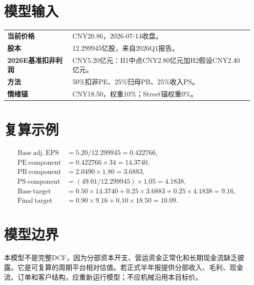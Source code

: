 \section{模型输入}
\small
\begin{tabularx}{0.94\linewidth}{L{3.2cm}X}
\textbf{当前价格} & CNY20.86，2026-07-14收盘。 \\
\textbf{股本} & 12.299945亿股，来自2026Q1报告。 \\
\textbf{2026E基准扣非利润} & CNY5.20亿元：H1中点CNY2.80亿元加H2假设CNY2.40亿元。 \\
\textbf{方法} & 50\%扣非PE、25\%归母PB、25\%收入PS。 \\
\textbf{情绪锚} & CNY18.50，权重10\%；Street锚权重0\%。 \\
\end{tabularx}
\normalsize

\section{复算示例}
\[
\begin{array}{rl}
\mathrm{Base\ adj.\ EPS}&=5.20/12.299945=0.422766,\\
\mathrm{PE\ component}&=0.422766\times34=14.3740,\\
\mathrm{PB\ component}&=2.0490\times1.80=3.6883,\\
\mathrm{PS\ component}&=(49.01/12.299945)\times1.05=4.1838,\\
\mathrm{Base\ target}&=0.50\times14.3740+0.25\times3.6883+0.25\times4.1838=9.16,\\
\mathrm{Final\ target}&=0.90\times9.16+0.10\times18.50=10.09.
\end{array}
\]

\section{模型边界}
本模型不是完整DCF，因为分部资本开支、营运资金正常化和长期现金流缺乏披露。它是可复算的周期平台相对估值。若正式半年报提供分部收入、毛利、现金流、订单和客户结构，应重新运行模型；不应机械沿用本目标价。
